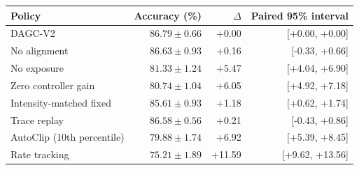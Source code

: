\begin{tabular}{lrrr}
\toprule
Policy & Accuracy (\%) & $\Delta$ & Paired 95\% interval \\
\midrule
DAGC-V2 & $86.79\pm0.66$ & +0.00 & [+0.00, +0.00] \\
No alignment & $86.63\pm0.93$ & +0.16 & [-0.33, +0.66] \\
No exposure & $81.33\pm1.24$ & +5.47 & [+4.04, +6.90] \\
Zero controller gain & $80.74\pm1.04$ & +6.05 & [+4.92, +7.18] \\
Intensity-matched fixed & $85.61\pm0.93$ & +1.18 & [+0.62, +1.74] \\
Trace replay & $86.58\pm0.56$ & +0.21 & [-0.43, +0.86] \\
AutoClip (10th percentile) & $79.88\pm1.74$ & +6.92 & [+5.39, +8.45] \\
Rate tracking & $75.21\pm1.89$ & +11.59 & [+9.62, +13.56] \\
\bottomrule
\end{tabular}
